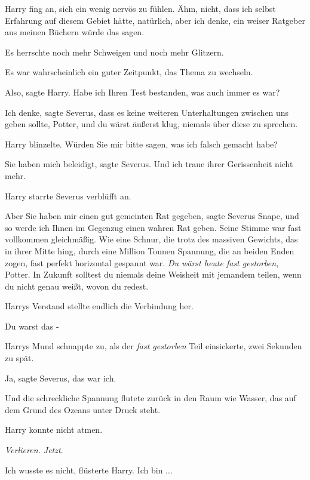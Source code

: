Harry fing an, sich ein wenig nervös zu fühlen. \glqq{}Ähm, nicht, dass ich
selbst Erfahrung auf diesem Gebiet hätte, natürlich, aber ich denke, ein weiser
Ratgeber aus meinen Büchern würde das sagen.\grqq{}

Es herrschte noch mehr Schweigen und noch mehr Glitzern.

Es war wahrscheinlich ein guter Zeitpunkt, das Thema zu wechseln.

\glqq{}Also\grqq{}, sagte Harry. \glqq{}Habe ich Ihren Test bestanden, was auch
immer es war?\grqq{}

\glqq{}Ich denke\grqq{}, sagte Severus, \glqq{}dass es keine weiteren
Unterhaltungen zwischen uns geben sollte, Potter, und du wärst äußerst klug,
niemals über diese zu sprechen.\grqq{}

Harry blinzelte. \glqq{}Würden Sie mir bitte sagen, was ich falsch gemacht
habe?\grqq{}

\glqq{}Sie haben mich beleidigt\grqq{}, sagte Severus. \glqq{}Und ich traue
ihrer Gerissenheit nicht mehr.\grqq{}

Harry starrte Severus verblüfft an.

\glqq{}Aber Sie haben mir einen gut gemeinten Rat gegeben\grqq{}, sagte Severus
Snape, \glqq{}und so werde ich Ihnen im Gegenzug einen wahren Rat geben.\grqq{}
Seine Stimme war fast vollkommen gleichmäßig. Wie eine Schnur, die trotz des
massiven Gewichts, das in ihrer Mitte hing, durch eine Million Tonnen Spannung,
die an beiden Enden zogen, fast perfekt horizontal gespannt war. \glqq{}\emph{Du
wärst heute fast gestorben}, Potter. In Zukunft solltest du niemals deine
Weisheit mit jemandem teilen, wenn du nicht genau weißt, wovon du redest.\grqq{}

Harrys Verstand stellte endlich die Verbindung her.

\glqq{}Du warst das -\grqq{}


Harrys Mund schnappte zu, als der \glqq{}\emph{fast gestorben}\grqq{} Teil
einsickerte, zwei Sekunden zu spät.

\glqq{}Ja\grqq{}, sagte Severus, \glqq{}das war ich.\grqq{}

Und die schreckliche Spannung flutete zurück in den Raum wie Wasser, das auf dem
Grund des Ozeans unter Druck steht.

Harry konnte nicht atmen.

\emph{Verlieren. Jetzt}.

\glqq{}Ich wusste es nicht\grqq{}, flüsterte Harry. \glqq{}Ich bin ...\grqq{}

